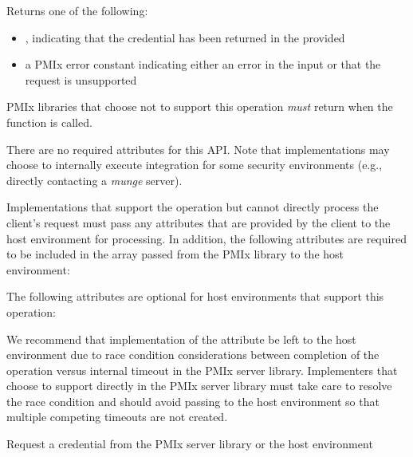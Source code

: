 Returns one of the following:

\begin{itemize}
    \item {}, indicating that the credential has been returned in the provided 
    \item a \ac{PMIx} error constant indicating either an error in the input or that the request is unsupported
\end{itemize}

\reqattrstart
\ac{PMIx} libraries that choose not to support this operation \textit{must} return  when the function is called.

There are no required attributes for this \ac{API}. Note that implementations may choose to internally
execute integration for some security environments (e.g., directly
contacting a \textit{munge} server).

Implementations that support the operation but cannot directly process the client's request must pass any attributes that are provided by the client to the host environment for processing. In addition, the following attributes are required to be included in the  array passed from the \ac{PMIx} library to the host environment:


\reqattrend

\optattrstart
The following attributes are optional for host environments that support this operation:


\optattrend

\adviceimplstart
We recommend that implementation of the  attribute be left to the host environment due to race condition considerations between completion of the operation versus internal timeout in the \ac{PMIx} server library. Implementers that choose to support  directly in the \ac{PMIx} server library must take care to resolve the race condition and should avoid passing  to the host environment so that multiple competing timeouts are not created.
\adviceimplend

\descr

Request a credential from the \ac{PMIx} server library or the host environment

\subsection{}

